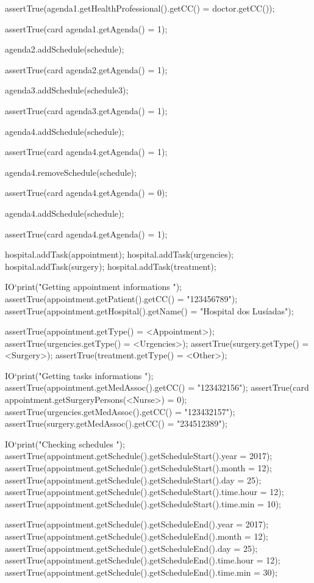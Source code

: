 \begin{vdmpp}[breaklines=true]
   assertTrue(agenda1.getHealthProfessional().getCC() = doctor.getCC());
   
   assertTrue(card agenda1.getAgenda() = 1);
   
   agenda2.addSchedule(schedule);
   
   assertTrue(card agenda2.getAgenda() = 1);
  
   agenda3.addSchedule(schedule3);
   
   assertTrue(card agenda3.getAgenda() = 1);
   
   agenda4.addSchedule(schedule);
   
   assertTrue(card agenda4.getAgenda() = 1);
   
   agenda4.removeSchedule(schedule);
   
   assertTrue(card agenda4.getAgenda() = 0);
   
   agenda4.addSchedule(schedule);
   
   assertTrue(card agenda4.getAgenda() = 1);
   
   hospital.addTask(appointment);
   hospital.addTask(urgencies);
   hospital.addTask(surgery);
   hospital.addTask(treatment);
   
   IO`print("\n Getting appointment informations \n");
   assertTrue(appointment.getPatient().getCC() = "123456789");
   assertTrue(appointment.getHospital().getName() = "Hospital dos Lusíadas");
   
   assertTrue(appointment.getType() = <Appointment>);
   assertTrue(urgencies.getType() = <Urgencies>);
   assertTrue(surgery.getType() = <Surgery>);
   assertTrue(treatment.getType() = <Other>);
  
   IO`print("\n Getting tasks informations \n");
   assertTrue(appointment.getMedAssoc().getCC() = "123432156");
   assertTrue(card appointment.getSurgeryPersons(<Nurse>) = 0);
   assertTrue(urgencies.getMedAssoc().getCC() = "123432157");
   assertTrue(surgery.getMedAssoc().getCC() = "234512389");
   
   IO`print("\n Checking schedules \n");
   assertTrue(appointment.getSchedule().getScheduleStart().year = 2017);
   assertTrue(appointment.getSchedule().getScheduleStart().month = 12);
   assertTrue(appointment.getSchedule().getScheduleStart().day = 25);
   assertTrue(appointment.getSchedule().getScheduleStart().time.hour = 12);
   assertTrue(appointment.getSchedule().getScheduleStart().time.min = 10);
   
   assertTrue(appointment.getSchedule().getScheduleEnd().year = 2017);
   assertTrue(appointment.getSchedule().getScheduleEnd().month = 12);
   assertTrue(appointment.getSchedule().getScheduleEnd().day = 25);
   assertTrue(appointment.getSchedule().getScheduleEnd().time.hour = 12);
   assertTrue(appointment.getSchedule().getScheduleEnd().time.min = 30);
   

\end{vdmpp}
